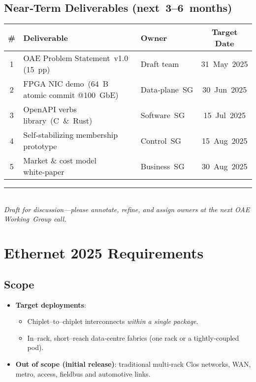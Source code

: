 \subsection{Near‑Term Deliverables (next 3–6 months)}
\footnotesize
\begin{center}
\begin{tabular}{@{}cllc@{}}
\toprule
\# & \textbf{Deliverable} & \textbf{Owner} & \textbf{Target Date}\\
\midrule
1 & OAE Problem Statement v1.0 (15 pp) & Draft team & 31 May 2025\\
2 & FPGA NIC demo (64 B atomic commit @100 GbE) & Data‑plane SG & 30 Jun 2025\\
3 & OpenAPI verbs library (C \& Rust) & Software SG & 15 Jul 2025\\
4 & Self‑stabilizing membership prototype & Control SG & 15 Aug 2025\\
5 & Market \& cost model white‑paper & Business SG & 30 Aug 2025\\
\bottomrule
\end{tabular}
\end{center}

\vfill
\begin{center}
\rule{0.6\linewidth}{0.4pt}\\
\footnotesize
\textit{Draft for discussion—please annotate, refine, and assign owners at the next OAE Working Group call.}
\end{center}
 
 
 
 
\section{Ethernet 2025 Requirements}

\subsection{Scope}
\begin{itemize}
  \item \textbf{Target deployments}:  
        \begin{itemize}
            \item Chiplet–to–chiplet interconnects \emph{within a single package}.  
            \item In–rack, short–reach data‑centre fabrics (one rack or a tightly‑coupled pod).  
        \end{itemize}
  \item \textbf{Out of scope (initial release)}:  
        traditional multi‑rack Clos networks, WAN, metro, access, fieldbus and automotive links.
\end{itemize}

